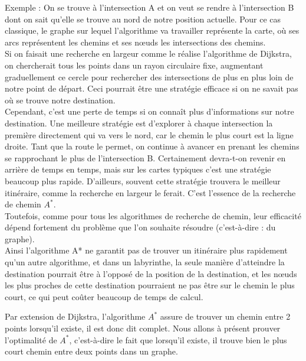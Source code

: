 \documentclass{article}
\begin{document}
Exemple : On se trouve à l'intersection A et on veut se rendre à l'intersection B dont on sait qu'elle se trouve au nord de notre position actuelle. Pour ce cas classique, le graphe sur lequel l'algorithme va travailler représente la carte, où ses arcs représentent les chemins et ses nœuds les intersections des chemins. \\
Si on faisait une recherche en largeur comme le réalise l'algorithme de Dijkstra, on chercherait tous les points dans un rayon circulaire fixe, augmentant graduellement ce cercle pour rechercher des intersections de plus en plus loin de notre point de départ. Ceci pourrait être une stratégie efficace si on ne savait pas où se trouve notre destination. \\
Cependant, c'est une perte de temps si on connaît plus d'informations sur notre destination. Une meilleure stratégie est d'explorer à chaque intersection la première directement qui va vers le nord, car le chemin le plus court est la ligne droite. Tant que la route le permet, on continue à avancer en prenant les chemins se rapprochant le plus de l'intersection B. Certainement devra-t-on revenir en arrière de temps en temps, mais sur les cartes typiques c'est une stratégie beaucoup plus rapide. D'ailleurs, souvent cette stratégie trouvera le meilleur itinéraire, comme la recherche en largeur le ferait. C'est l'essence de la recherche de chemin $A^*$. \\
Toutefois, comme pour tous les algorithmes de recherche de chemin, leur efficacité dépend fortement du problème que l'on souhaite résoudre (c'est-à-dire : du graphe).  \\
Ainsi l'algorithme A* ne garantit pas de trouver un itinéraire plus rapidement qu'un autre algorithme, et dans un labyrinthe, la seule manière d'atteindre la destination pourrait être à l'opposé de la position de la destination, et les nœuds les plus proches de cette destination pourraient ne pas être sur le chemin le plus court, ce qui peut coûter beaucoup de temps de calcul.

Par extension de Dijkstra, l’algorithme $A^*$ assure de trouver un chemin entre  2 points lorsqu’il existe, il est donc dit complet. Nous allons à présent prouver l’optimalité de $A^*$, c’est-à-dire le fait que lorsqu’il existe, il trouve bien le plus court chemin entre deux points dans un graphe.
\end{document}

